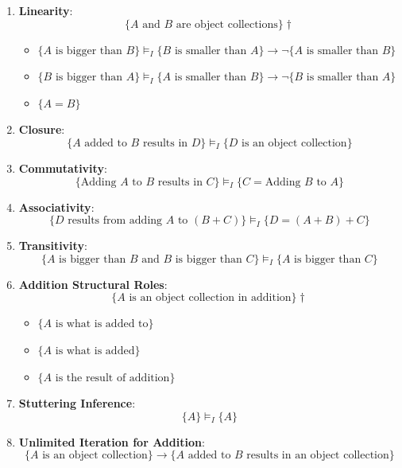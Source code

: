 \documentclass[12pt]{book}
\begin{document}
\begin{enumerate}
    \item \textbf{Linearity}:
    \[
    \{ A \text{ and } B \text{ are object collections} \} \dagger
    \]
    \begin{itemize}
        \item \(\{ A \text{ is bigger than } B \} \vDash_{I} \{ B \text{ is smaller than } A \} \rightarrow \neg \{ A \text{ is smaller than } B \}\)
        \item \(\{ B \text{ is bigger than } A \} \vDash_{I} \{ A \text{ is smaller than } B \} \rightarrow \neg \{ B \text{ is smaller than } A \}\)
        \item \(\{ A = B \}\)
    \end{itemize}
    
    \item \textbf{Closure}:
    \[
    \{ A \text{ added to } B \text{ results in } D \} \vDash_{I} \{ D \text{ is an object collection} \}
    \]
    
    \item \textbf{Commutativity}:
    \[
    \{ \text{Adding } A \text{ to } B \text{ results in } C \} \vDash_{I} \{ C = \text{Adding } B \text{ to } A \}
    \]
    
    \item \textbf{Associativity}:
    \[
    \{ D \text{ results from adding } A \text{ to } (B + C) \} \vDash_{I} \{ D = (A + B) + C \}
    \]
    
    \item \textbf{Transitivity}:
    \[
    \{ A \text{ is bigger than } B \text{ and } B \text{ is bigger than } C \} \vDash_{I} \{ A \text{ is bigger than } C \}
    \]
    
    \item \textbf{Addition Structural Roles}:
    \[
    \{ A \text{ is an object collection in addition} \} \dagger
    \]
    \begin{itemize}
        \item \(\{ A \text{ is what is added to} \}\)
        \item \(\{ A \text{ is what is added} \}\)
        \item \(\{ A \text{ is the result of addition} \}\)
    \end{itemize}
    
    \item \textbf{Stuttering Inference}:
    \[
    \{ A \} \vDash_{I} \{ A \}
    \]
    
    \item \textbf{Unlimited Iteration for Addition}:
    \[
    \{ A \text{ is an object collection} \} \rightarrow \{ A \text{ added to } B \text{ results in an object collection} \}
    \]
    

\end{enumerate}
\end{document}
